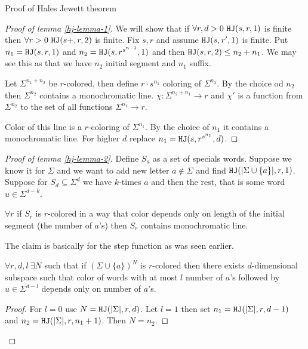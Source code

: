 \begin{topic}{Proof of Hales Jewett theorem}
	\begin{proof}[Proof of lemma \ref{hj-lemma-1}]
		We will show that if $\forall r, d > 0 \ \mathtt{HJ}(s,r,1)$ is finite then $\forall r > 0 \ \mathtt{HJ}(s+, r, 2)$ is finite. Fix $s, r$ and assume $\mathtt{HJ}(s, r', 1)$ is finite. Put $n_1 = \mathtt{HJ}(s,r,1)$ and $n_2 = \mathtt{HJ}(s, r^{s^{n-1}}, 1)$ and then $\mathtt{HJ}(s,r,2) \leq n_2 + n_1$. We may see this as that we have $n_2$ initial segment and $n_1$ suffix.
		
		Let $\Sigma^{n_1 + n_2}$ be $r$-colored, then define $r \cdot s^{n_1}$ coloring of $\Sigma^{n_2}$. By the choice od $n_2$ then $\Sigma^{n_2}$ contains a monochromatic line. $\chi : \Sigma^{n_2 + n_1} \to r$ and $\chi'$ is a function from $\Sigma^{n_2}$ to the set of all functions $\Sigma^{n_1} \to r$.
		
		Color of this line is a $r$-coloring of $\Sigma^{n_1}$. By the choice of $n_1$ it contains a monochromatic line. For higher $d$ replace $n_1 = \mathtt{HJ}(s, r^{s^{n_1}}, d)$.
	\end{proof}

	\begin{proof}[Proof of lemma \ref{hj-lemma-2}]
		Define $S_a$ as a set of specials words. Suppose we know it for $\Sigma$ and we want to add new letter $a \notin \Sigma$ and find $\mathtt{HJ}(|\Sigma \cup \{a\}|, r, 1)$. Suppose for $S_d \subseteq \Sigma^d$ we have $k$-times $a$ and then the rest, that is some word $u \in \Sigma^{d-k}$.
		
		\begin{claim}
			$\forall r$ if $S_r$ is $r$-colored in a way that color depends only on length of the initial segment (the number of $a$'s) then $S_r$ contains monochromatic line.
		\end{claim}
	
		The claim is basically for the step function as was seen earlier.
		
		\begin{claim}
			$\forall r, d, l \ \exists N$ such that if $(\Sigma \cup \{a\})^N$ is $r$-colored then there exists $d$-dimensional subspace such that color of words with at most $l$ number of $a$'s followed by $u \in \Sigma^{d-l}$ depends only on number of $a$'s.
		\end{claim}
	
		\begin{proof}
			For $l = 0$ use $N = \mathtt{HJ}(|\Sigma|, r, d)$. Let $l = 1$ then set $n_1 = \mathtt{HJ}(|\Sigma|, r, d-1)$ and $n_2 = \mathtt{HJ}(|\Sigma|, r, n_1 + 1)$. Then $N = n_2$.
		\end{proof}
	\end{proof}
\end{topic}